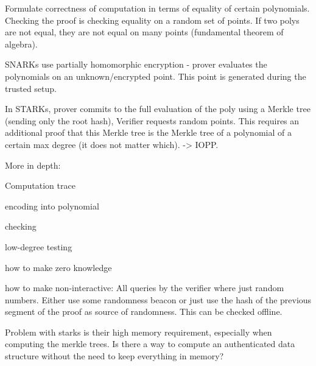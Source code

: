 \documentclass[11pt,letterpaper]{article}
\begin{document}
Formulate correctness of computation in terms of equality of certain polynomials.
Checking the proof is checking equality on a random set of points. If two polys are not equal, they
are not equal on many points (fundamental theorem of algebra).

SNARKs use partially homomorphic encryption - prover evaluates the polynomials on an unknown/encrypted point.
This point is generated during the trusted setup.

In STARKs, prover commits to the full evaluation of the poly using a Merkle tree (sending only the root hash),
Verifier requests random points. This requires an additional proof that this Merkle tree is the
Merkle tree of a polynomial of a certain max degree (it does not matter which). -> IOPP.

More in depth:

Computation trace

encoding into polynomial

checking

low-degree testing

how to make zero knowledge

how to make non-interactive:
All queries by the verifier where just random numbers. Either use some randomness beacon
or just use the hash of the previous segment of the proof as source of randomness. This can be checked
offline.

Problem with starks is their high memory requirement, especially when computing the merkle trees.
Is there a way to compute an authenticated data structure without the need to keep everything in memory?
\end{document}
